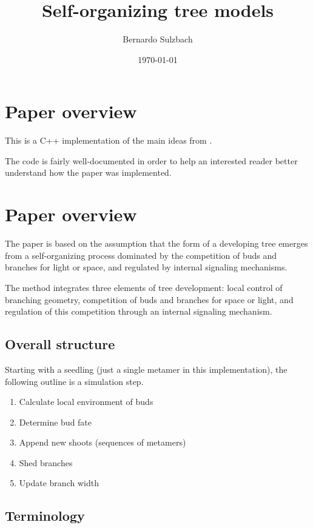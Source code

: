 \documentclass{article}
\title{Self-organizing tree models}
\author{Bernardo Sulzbach}
\date{\today}
\begin{document}
\maketitle

\section{Paper overview}

This is a C++ implementation of the main ideas from \cite{Palubicki2009}.

The code is fairly well-documented in order to help an interested reader better understand how the paper was implemented.

\section{Paper overview}

The paper is based on the assumption that the form of a developing tree emerges from a self-organizing process dominated by the competition of buds and branches for light or space, and regulated by internal signaling mechanisms.

The method integrates three elements of tree development: local control of branching geometry, competition of buds and branches for space or light, and regulation of this competition through an internal signaling mechanism.

\subsection{Overall structure}

Starting with a seedling (just a single metamer in this implementation), the following outline is a simulation step.

\begin{enumerate}
\item Calculate local environment of buds
\item Determine bud fate
\item Append new shoots (sequences of metamers)
\item Shed branches
\item Update branch width
\end{enumerate}

\subsection{Terminology}
\end{document}
